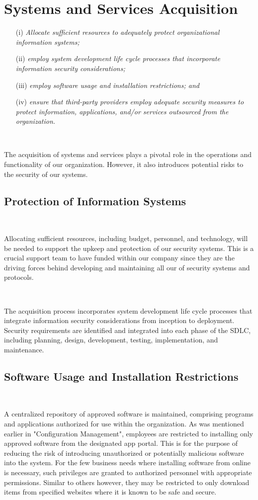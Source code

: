 \documentclass[12pt,a4paper]{report}
\begin{document}
\chapter{Systems and Services Acquisition}
\begin{enumerate}
 \item[(i)]	\textit{Allocate sufficient resources to adequately protect organizational information systems;}
 \item[(ii)] \textit{employ system development life cycle processes that incorporate information security considerations;}
 \item[(iii)] \textit{employ software usage and installation restrictions; and}
 \item[(iv)] \textit{ensure that third-party providers employ adequate security measures to protect information, applications, and/or services outsourced from the organization.}
\end{enumerate}

\

The acquisition of systems and services plays a pivotal role in the operations and functionality of our organization. However, it also introduces potential risks to the security of our systems.

\section{Protection of Information Systems}
\

Allocating sufficient resources, including budget, personnel, and technology, will be needed to support the upkeep and protection of our security systems.
This is a crucial support team to have funded within our company since they are the driving forces behind developing and maintaining all our of security systems and protocols.

\

The acquisition process incorporates system development life cycle processes that integrate information security considerations from inception to deployment.
Security requirements are identified and integrated into each phase of the SDLC, including planning, design, development, testing, implementation, and maintenance.

\section{Software Usage and Installation Restrictions}
\

A centralized repository of approved software is maintained, comprising programs and applications authorized for use within the organization.
As was mentioned earlier in "Configuration Management", employees are restricted to installing only approved software from the designated app portal.
This is for the purpose of reducing the risk of introducing unauthorized or potentially malicious software into the system.
For the few business needs where installing software from online is necessary, such privileges are granted to authorized personnel with appropriate permissions.
Similar to others however, they may be restricted to only download items from specified websites where it is known to be safe and secure.
\end{document}
